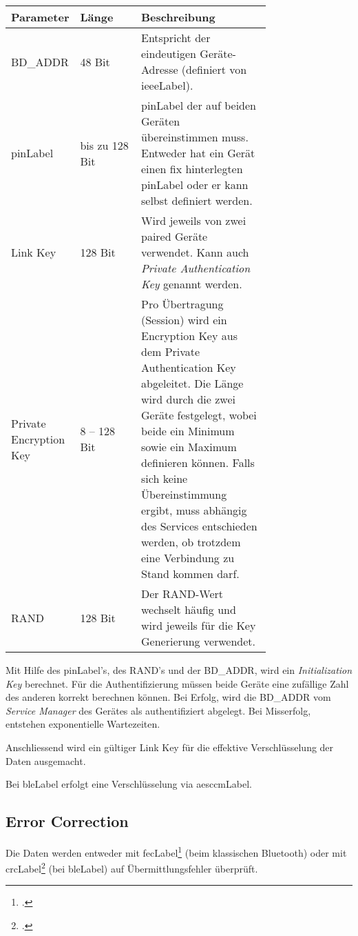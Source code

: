 \begin{table}[H]
	\small\sffamily\renewcommand{\arraystretch}{1.4}
	\begin{tabular}{p{0.25\linewidth}lp{0.5\linewidth}}
		\toprule
		Parameter & Länge & Beschreibung \\
		\midrule
		BD\_ADDR & 48 Bit & Entspricht der eindeutigen Geräte-Adresse (definiert von \gls{ieeeLabel}). \\
		\gls{pinLabel} & bis zu 128 Bit & \gls{pinLabel} der auf beiden Geräten übereinstimmen muss. Entweder hat ein Gerät einen fix hinterlegten \gls{pinLabel} oder er kann selbst definiert werden.\\
		Link Key & 128 Bit  & Wird jeweils von zwei paired Geräte verwendet. Kann auch \textit{Private Authentication Key} genannt werden.\\
		Private Encryption Key & 8 -- 128 Bit & Pro Übertragung (Session) wird ein Encryption Key aus dem Private Authentication Key abgeleitet. Die Länge wird durch die zwei Geräte festgelegt, wobei beide ein Minimum sowie ein Maximum definieren können. Falls sich keine Übereinstimmung ergibt, muss abhängig des Services entschieden werden, ob trotzdem eine Verbindung zu Stand kommen darf. \\
		RAND & 128 Bit & Der RAND-Wert wechselt häufig und wird jeweils für die Key Generierung verwendet.\\
		\bottomrule
	\end{tabular}
\end{table}

Mit Hilfe des \gls{pinLabel}'s, des RAND's und der BD\_ADDR, wird ein \textit{Initialization Key} berechnet.
Für die Authentifizierung müssen beide Geräte eine zufällige Zahl des anderen korrekt berechnen können.
Bei Erfolg, wird die BD\_ADDR vom \textit{Service Manager} des Gerätes als authentifiziert abgelegt. Bei Misserfolg, entstehen exponentielle Wartezeiten.

Anschliessend wird ein gültiger Link Key für die effektive Verschlüsselung der Daten ausgemacht.

Bei \gls{bleLabel} erfolgt eine Verschlüsselung via \gls{aesccmLabel}.

\subsection{Error Correction}
Die Daten werden entweder mit \gls{fecLabel}\footcite{Forward_error_correction_Wikipedia_2015-04-27} (beim klassischen Bluetooth) oder mit \gls{crcLabel}\footcite{Cyclic_redundancy_check_Wikipedia_2015-04-27} (bei \gls{bleLabel}) auf Übermittlungsfehler überprüft.

